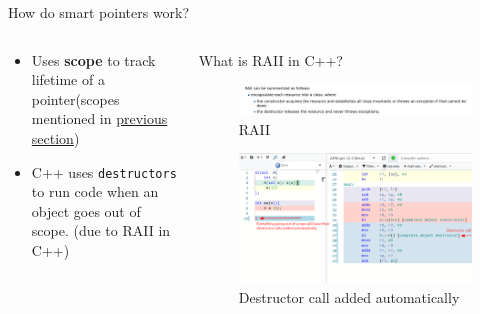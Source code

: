 \documentclass[
  10pt,
  ignorenonframetext,
]{beamer}
\providecommand{\tightlist}{%
  \setlength{\itemsep}{0pt}\setlength{\parskip}{0pt}}
\begin{document}
\begin{frame}{How do smart pointers work?}
\protect\hypertarget{how-do-smart-pointers-work}{}
\begin{columns}[T]
\begin{column}{0.3\textwidth}
\vspace{20pt}

\begin{itemize}
\tightlist
\item
  Uses \textbf{scope} to track lifetime of a
  pointer(scopes mentioned in
  \protect\hyperlink{what-is-this-scope-thing}{previous
  section})
\end{itemize}

\pause

\begin{itemize}
\tightlist
\item
  C++ uses \texttt{destructors} to run code when
  an object goes out of scope. (due to RAII in
  C++)
\end{itemize}

\pause
\end{column}

\begin{column}{0.7\textwidth}
\begin{block}{What is RAII in C++?}
\protect\hypertarget{what-is-raii-in-c}{}
\begin{figure}
\centering
\includegraphics{images/raii.png}
\caption{RAII}
\end{figure}

\begin{figure}
\centering
\includegraphics{images/./destructor.png}
\caption{Destructor call added automatically}
\end{figure}
\end{block}
\end{column}
\end{columns}
\end{frame}
\end{document}
